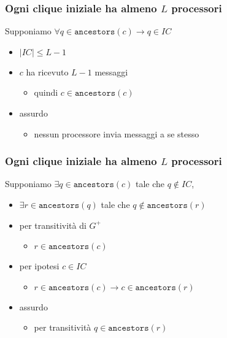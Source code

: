 \documentclass{beamer}
\begin{document}
\begin{frame}\frametitle{Ogni clique iniziale ha almeno $L$ processori}
Supponiamo $\forall q \in \texttt{ancestors}(c)\rightarrow q\in IC$
\begin{itemize}
\item $|IC|\leq L-1$
\item $c$ ha ricevuto $L-1$ messaggi
\begin{itemize}
\item quindi $c\in\texttt{ancestors}(c)$
\end{itemize}
\item assurdo
\begin{itemize}
\item  nessun processore invia messaggi a se stesso
\end{itemize}
\end{itemize}
\begin{figure}\centering\end{figure}
\end{frame}


\begin{frame}\frametitle{Ogni clique iniziale ha almeno $L$ processori}
Supponiamo $\exists q\in\texttt{ancestors}(c)$ tale che $q \not\in IC$,
\begin{itemize}
\item $\exists r\in\texttt{ancestors}(q)$ tale che $q\not\in\texttt{ancestors}(r)$
\item per transitività di $G^+$
\begin{itemize}
\item $r \in \texttt{ancestors} (c)$
\end{itemize}
\item per ipotesi $c \in IC$
\begin{itemize}
\item $r \in\texttt{ancestors} (c) \rightarrow c \in \texttt{ancestors}(r)$
\end{itemize}
\item assurdo
\begin{itemize}
\item per transitività $q \in\texttt{ancestors}(r)$
\end{itemize}
\end{itemize}	
\begin{figure}\centering\end{figure}
\end{frame}
\end{document}
